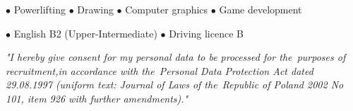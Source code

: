 \documentclass[11pt,a4paper]{article}
\begin{document}
  \medskip
  \centerline{
    \hfill
    $\bullet$ Powerlifting
    \hfill
    $\bullet$ Drawing
    \hfill
    $\bullet$ Computer graphics
    \hfill
    $\bullet$ Game development
    \hfill
  }
  
  
  \vspace{0.5cm}
  
  \medskip
  \centerline{
    \hfill
    $\bullet$ English B2 (Upper-Intermediate)
    \hfill
    $\bullet$ Driving licence B
    \hfill
  }
  
  
  \vspace{0.92cm}
  \noindent \textit{"I hereby give consent for my personal data to be processed for the~purposes
  of recruitment,\linebreak in accordance with the~Personal Data Protection Act dated 29.08.1997
  (uniform text: Journal of Laws of the~Republic of Poland 2002 No 101, item 926
  with further amendments)."}
\end{document}
